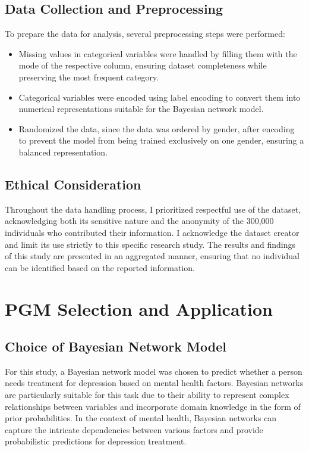 \documentclass[conference]{IEEEtran}
\begin{document}
\subsection{Data Collection and Preprocessing}
To prepare the data for analysis, several preprocessing steps were performed:
\begin{itemize}
    \item Missing values in categorical variables were handled by filling them with the mode of the respective column, ensuring dataset completeness while preserving the most frequent category.
    \item Categorical variables were encoded using label encoding to convert them into numerical representations suitable for the Bayesian network model.
    \item Randomized the data, since the data was ordered by gender, after encoding to prevent the model from being trained exclusively on one gender, ensuring a balanced representation.
\end{itemize}

\subsection{Ethical Consideration }
Throughout the data handling process, I prioritized respectful use of the dataset, acknowledging both its sensitive nature and the anonymity of the 300,000 individuals who contributed their information. I acknowledge the dataset creator and limit its use strictly to this specific research study. The results and findings of this study are presented in an aggregated manner, ensuring that no individual can be identified based on the reported information.

\section{PGM Selection and Application}
\subsection{Choice of Bayesian Network Model}
For this study, a Bayesian network model was chosen to predict whether a person needs treatment for depression based on mental health factors. Bayesian networks are particularly suitable for this task due to their ability to represent complex relationships between variables and incorporate domain knowledge in the form of prior probabilities. In the context of mental health, Bayesian networks can capture the intricate dependencies between various factors and provide probabilistic predictions for depression treatment.
\end{document}
